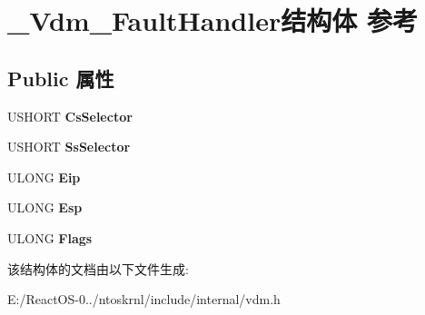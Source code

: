 \hypertarget{struct___vdm___fault_handler}{}\section{\+\_\+\+Vdm\+\_\+\+Fault\+Handler结构体 参考}
\label{struct___vdm___fault_handler}
\subsection*{Public 属性}
\begin{DoxyCompactItemize}
\item 
\mbox{\label{struct___vdm___fault_handler_adc96798a6eeb40b9666f1bf62fca5a37}} 
U\+S\+H\+O\+RT {\bfseries Cs\+Selector}
\item 
\mbox{\label{struct___vdm___fault_handler_a511605f0b117133d022dd47b846cd0b1}} 
U\+S\+H\+O\+RT {\bfseries Ss\+Selector}
\item 
\mbox{\label{struct___vdm___fault_handler_a9a20d461b6faad3c0112158070baad0a}} 
U\+L\+O\+NG {\bfseries Eip}
\item 
\mbox{\label{struct___vdm___fault_handler_a57549283f56791ac4e12cd07ee584838}} 
U\+L\+O\+NG {\bfseries Esp}
\item 
\mbox{\label{struct___vdm___fault_handler_a7a1b323636c0f36d8d281b1020aee10e}} 
U\+L\+O\+NG {\bfseries Flags}
\end{DoxyCompactItemize}


该结构体的文档由以下文件生成\+:\begin{DoxyCompactItemize}
\item 
E\+:/\+React\+O\+S-\/0../ntoskrnl/include/internal/vdm.\+h\end{DoxyCompactItemize}
